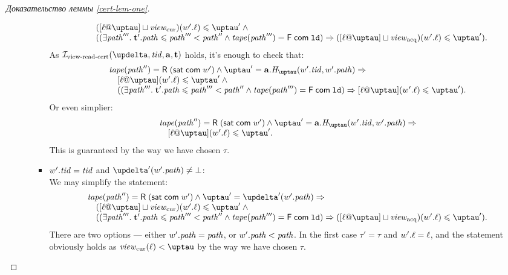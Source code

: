 \begin{proof}[Доказательство леммы \ref{cert-lem-one}]
\begin{itemize}
\begin{itemize}
\begin{itemize}
\[\begin{array}{l}
            \quad ([\loc @ \tau] \sqcup \Rcur)(\w'.\loc) \le \tau' \land {} \\
            \quad ((\exists \cpath'''. \; \tT'.\cpath \le \cpath''' < \cpath'' \land 
                         \tape(\cpath''') = \tapeFence{\Committed}{\LD}) \Rightarrow
                         ([\loc @ \tau] \sqcup \Racq)(\w'.\loc) \le \tau'). \\
          \end{array}\]
          As $\invViewReadCERT(\delta, \tId, \aT, \tT)$ holds, it's enough to check that:
          \[\begin{array}{l}
            \tape(\cpath'') = \tapeRead{(\tapeSatisfied{\Committed}{\w'})} \land
               \tau' = \aT.\tmap(\w'.\tId, \w'.\cpath) \Rightarrow \\
            \quad [\loc @ \tau](\w'.\loc) \le \tau' \land {} \\
            \quad ((\exists \cpath'''. \; \tT'.\cpath \le \cpath''' < \cpath'' \land 
                         \tape(\cpath''') = \tapeFence{\Committed}{\LD}) \Rightarrow
                         [\loc @ \tau](\w'.\loc) \le \tau'). \\
          \end{array}\]
          Or even simplier:
          \[\begin{array}{l}
            \tape(\cpath'') = \tapeRead{(\tapeSatisfied{\Committed}{\w'})} \land
               \tau' = \aT.\tmap(\w'.\tId, \w'.\cpath) \Rightarrow \\
            \quad [\loc @ \tau](\w'.\loc) \le \tau'. \\
          \end{array}\]
          This is guaranteed by the way we have chosen $\tau$.
          
            \item $w'.\mathit{tid} = \mathit{tid}$ and $\delta'(\w'.\cpath) \not = \bot$: \\
              We may simplify the statement:
          \[\begin{array}{l}
            \tape(\cpath'') = \tapeRead{(\tapeSatisfied{\Committed}{\w'})} \land
               \tau' = \delta'(\w'.\cpath) \Rightarrow \\
            \quad ([\loc @ \tau] \sqcup \Rcur)(\w'.\loc) \le \tau' \land {} \\
            \quad ((\exists \cpath'''. \; \tT'.\cpath \le \cpath''' < \cpath'' \land 
                         \tape(\cpath''') = \tapeFence{\Committed}{\LD}) \Rightarrow
                         ([\loc @ \tau] \sqcup \Racq)(\w'.\loc) \le \tau'). \\
          \end{array}\]
              There are two options --- either $w'.\mathit{path} = \mathit{path}$, or $w'.\mathit{path} < \mathit{path}$.
              In the first case $\tau' = \tau$ and $w'.\ell = \ell$, and the statement obviously holds as $\Rcur(\loc) < \tau$
              by the way we have chosen $\tau$.
              

\end{itemize}
\end{itemize}
\end{itemize}
\end{proof}
